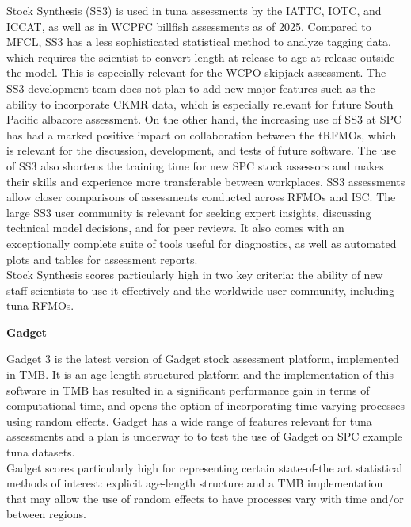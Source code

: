 \documentclass{SCreport}
\begin{document}
Stock Synthesis (SS3) is used in tuna assessments by the IATTC, IOTC, and ICCAT,
as well as in WCPFC billfish assessments as of 2025.
Compared to MFCL, SS3 has a less sophisticated statistical method to analyze
tagging data, which requires the scientist to convert length-at-release to
age-at-release outside the model. This is especially relevant for the WCPO
skipjack assessment. The SS3 development team does not plan to add new major
features such as the ability to incorporate CKMR data, which is especially
relevant for future South Pacific albacore assessment. On the other hand, the
increasing use of SS3 at SPC has had a marked positive impact on collaboration
between the tRFMOs, which is relevant for the discussion, development, and tests
of future software. The use of SS3 also shortens the training time for new SPC
stock assessors and makes their skills and experience more transferable between
workplaces. SS3 assessments allow closer comparisons of assessments conducted
across RFMOs and ISC. The large SS3 user community is relevant for seeking
expert insights, discussing technical model decisions, and for peer reviews. It
also comes with an exceptionally complete suite of tools useful for diagnostics,
as well as automated plots and tables for assessment reports.\\[-4.5ex]

Stock Synthesis scores particularly high in two key criteria: the ability of new
staff scientists to use it effectively and the worldwide user community,
including tuna RFMOs.

\vspace{1ex}

\textbf{Gadget}

\vspace{-1ex}

Gadget 3 is the latest version of Gadget stock assessment platform, implemented
in TMB. It is an age-length structured platform and the implementation of this
software in TMB has resulted in a significant performance gain in terms of
computational time, and opens the option of incorporating time-varying processes
using random effects. Gadget has a wide range of features relevant for tuna
assessments and a plan is underway to to test the use of Gadget on SPC example
tuna datasets.\\[-4.5ex]

Gadget scores particularly high for representing certain state-of-the art
statistical methods of interest: explicit age-length structure and a TMB
implementation that may allow the use of random effects to have processes vary
with time and/or between regions.
\end{document}

